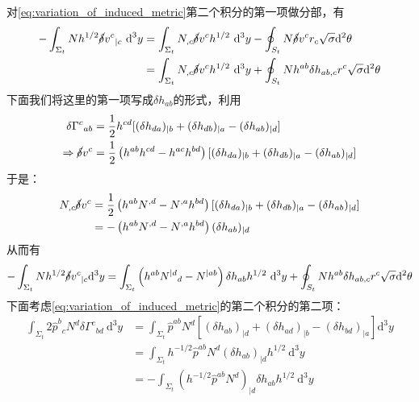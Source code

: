 \documentclass[hyperref, UTF8, a4paper]{ctexart}
\begin{document}
对\eqref{eq:variation_of_induced_metric}第二个积分的第一项做分部，有
\begin{equation*}
	\begin{aligned}
		-\int _{\Sigma _{t}} Nh^{1/2}\cancel{\delta } v^{c}{}_{|c}\mathrm{\ d}^{3} y & =\int _{\Sigma _{t}} N_{,c}\cancel{\delta } v^{c} h^{1/2} \ \mathrm{d}^{3} y-\oint _{S_{t}} N\cancel{\delta } v^{c} r_{c}\sqrt{\sigma }\mathrm{d}^{2} \theta \\
		& =\int _{\Sigma _{t}} N_{,c}\cancel{\delta } v^{c} h^{1/2} \ \mathrm{d}^{3} y+\oint _{S_{t}} Nh^{ab} \delta h_{ab,c} r^{c}\sqrt{\sigma }\mathrm{d}^{2} \theta 
	\end{aligned}
\end{equation*}
下面我们将这里的第一项写成$\delta h_{ab}$的形式，利用
\begin{equation*}
	\begin{aligned}
		\delta \Gamma ^{c}{}_{ab} & =\frac{1}{2} h^{cd}[( \delta h_{da})_{\mid b} +( \delta h_{db})_{\mid a} -( \delta h_{ab})_{\mid d}]\\
		\Rightarrow \cancel{\delta } v^{c} & =\frac{1}{2}\left( h^{ab} h^{cd} -h^{ac} h^{bd}\right)[( \delta h_{da})_{\mid b} +( \delta h_{db})_{\mid a} -( \delta h_{ab})_{\mid d}]
	\end{aligned}
\end{equation*}
于是：
\begin{equation*}
	\begin{aligned}
		N_{,c}\cancel{\delta } v^{c} & =\frac{1}{2}\left( h^{ab} N^{,d} -N^{,a} h^{bd}\right)[( \delta h_{da})_{\mid b} +( \delta h_{db})_{\mid a} -( \delta h_{ab})_{\mid d}]\\
		& =-\left( h^{ab} N^{,d} -N^{,a} h^{bd}\right)( \delta h_{ab})_{\mid d}
	\end{aligned}
\end{equation*}
从而有
\begin{equation*}
	-\int _{\Sigma _{t}} Nh^{1/2}\cancel{\delta } v^{c}{}_{|c}\mathrm{d}^{3} y=\int _{\Sigma _{t}}\left( h^{ab} N^{\mid d}{}_{d} -N^{\mid ab}\right) \delta h_{ab} h^{1/2} \ \mathrm{d}^{3} y+\oint _{S_{t}} Nh^{ab} \delta h_{ab,c} r^{c}\sqrt{\sigma }\mathrm{d}^{2} \theta 
\end{equation*}
下面考虑\eqref{eq:variation_of_induced_metric}的第二个积分的第二项：
\begin{equation*}
	\begin{aligned}
		\int _{\Sigma _{t}} 2\hat{p}^{b}{}_{c} N^{d} \delta \Gamma ^{c}{}_{bd} \ \mathrm{d}^{3} y & =\int _{\Sigma _{t}}\hat{p}^{ab} N^{d}[( \delta h_{ab})_{\mid d} +( \delta h_{ad})_{\mid b} -( \delta h_{bd})_{\mid a}]\mathrm{d}^{3} y\\
		& =\int _{\Sigma _{t}} h^{-1/2}\hat{p}^{ab} N^{d}( \delta h_{ab})_{\mid d} h^{1/2} \ \mathrm{d}^{3} y\\
		& =-\int _{\Sigma _{t}} (h^{-1/2}\hat{p}^{ab} N^{d} )_{\mid d} \delta h_{ab} h^{1/2} \ \mathrm{d}^{3} y
	\end{aligned}
\end{equation*}
\end{document}
